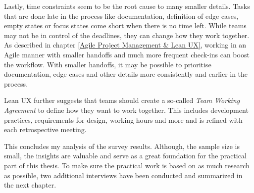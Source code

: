 Lastly, time constraints seem to be the root cause to many smaller details. Tasks that are done late
in the process like documentation, definition of edge cases, empty states or focus states come short
when there is no time left. While teams may not be in control of the deadlines, they can change how
they work together. As described in chapter \ref{Agile Project Management & Lean UX}, working in an
Agile manner with smaller handoffs and much more frequent check-ins can boost the workflow. With
smaller handoffs, it may be possible to prioritise documentation, edge cases and other details more
consistently and earlier in the process.

Lean UX further suggests that teams should create a so-called \textit{Team Working Agreement} to
define how they want to work together. This includes development practices, requirements for design,
working hours and more and is refined with each retrospective meeting.

This concludes my analysis of the survey results. Although, the sample size is small, the insights
are valuable and serve as a great foundation for the practical part of this thesis. To make sure the
practical work is based on as much research as possible, two additional interviews have been
conducted and summarized in the next chapter.
